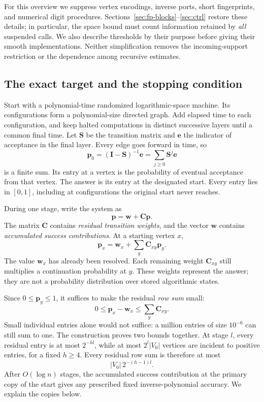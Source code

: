 \documentclass[11pt]{article}
\numberwithin{equation}{section}
\theoremstyle{definition}
\theoremstyle{remark}
\begin{document}
For this overview we suppress vertex encodings, inverse ports, short fingerprints, and numerical digit procedures. Sections~\ref{sec:fp-blocks}--\ref{sec:ctrl} restore these details; in particular, the space bound must count information retained by \emph{all} suspended calls. We also describe thresholds by their purpose before giving their smooth implementations. Neither simplification removes the incoming-support restriction or the dependence among recursive estimates.

\subsection{The exact target and the stopping condition}

Start with a polynomial-time randomized logarithmic-space machine. Its configurations form a polynomial-size directed graph. Add elapsed time to each configuration, and keep halted computations in distinct successive layers until a common final time. Let \(\mathbf S\) be the transition matrix and \(\mathbf e\) the indicator of acceptance in the final layer. Every edge goes forward in time, so
\[
 \mathbf p_0=(\mathbf I-\mathbf S)^{-1}\mathbf e
       =\sum_{j\geq0}\mathbf S^j\mathbf e
\]
is a finite sum. Its entry at a vertex is the probability of eventual acceptance from that vertex. The answer is its entry at the designated start. Every entry lies in \([0,1]\), including at configurations the original start never reaches.

During one stage, write the system as
\begin{equation}
 \mathbf p=\mathbf w+\mathbf C\mathbf p.
 \label{eq:overview-invariant}
\end{equation}
The matrix \(\mathbf C\) contains \emph{residual transition weights}, and the vector \(\mathbf w\) contains \emph{accumulated success contributions}. At a starting vertex \(x\),
\[
 \mathbf p_x=\mathbf w_x+\sum_y\mathbf C_{xy}\mathbf p_y.
\]
The value \(\mathbf w_x\) has already been resolved. Each remaining weight \(\mathbf C_{xy}\) still multiplies a continuation probability at \(y\). These weights represent the answer; they are not a probability distribution over stored algorithmic states.

Since \(0\leq\mathbf p_y\leq1\), it suffices to make the residual \emph{row sum} small:
\begin{equation}
 0\leq\mathbf p_x-\mathbf w_x\leq\sum_y\mathbf C_{xy}.
 \label{eq:overview-stop}
\end{equation}
Small individual entries alone would not suffice: a million entries of size \(10^{-6}\) can still sum to one. The construction proves two bounds together. At stage \(l\), every residual entry is at most \(2^{-hl}\), while at most \(2^l|V_0|\) vertices are incident to positive entries, for a fixed \(h\geq4\). Every residual row sum is therefore at most
\[
 |V_0|\,2^{-(h-1)l}.
\]
After \(O(\log n)\) stages, the accumulated success contribution at the primary copy of the start gives any prescribed fixed inverse-polynomial accuracy. We explain the copies below.
\end{document}
